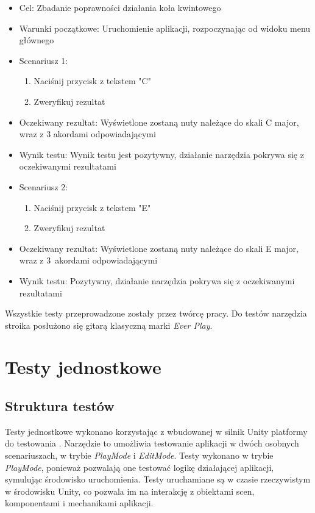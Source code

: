 \begin{itemize}
    \item Cel: Zbadanie poprawności działania koła kwintowego
    \item Warunki początkowe: Uruchomienie aplikacji, rozpoczynając od widoku menu głównego
    \item Scenariusz 1:
        \begin{enumerate}
            \item Naciśnij przycisk z tekstem "C"
            \item Zweryfikuj rezultat
        \end{enumerate}
    \item Oczekiwany rezultat: Wyświetlone zostaną nuty należące do skali C major, wraz z 3 akordami odpowiadającymi 
    \item Wynik testu: Wynik testu jest pozytywny, działanie narzędzia pokrywa się z oczekiwanymi rezultatami
    \item Scenariusz 2:
        \begin{enumerate}
            \item Naciśnij przycisk z tekstem "E"
            \item Zweryfikuj rezultat
        \end{enumerate}
    \item Oczekiwany rezultat: Wyświetlone zostaną nuty należące do skali E major, wraz z 3~akordami odpowiadającymi 
    \item Wynik testu: Pozytywny, działanie narzędzia pokrywa się z oczekiwanymi rezultatami
\end{itemize}

Wszystkie testy przeprowadzone zostały przez twórcę pracy. Do testów narzędzia stroika posłużono się gitarą klasyczną marki \emph{Ever Play}.

\section{Testy jednostkowe}

\subsection{Struktura testów}

Testy jednostkowe wykonano korzystając z wbudowanej w silnik Unity platformy do testowania \cite{UnityTestFramework}. Narzędzie to umożliwia testowanie aplikacji w dwóch osobnych scenariuszach, w trybie \emph{PlayMode} i \emph{EditMode}. Testy wykonano w trybie \emph{PlayMode}, ponieważ pozwalają one testować logikę działającej aplikacji, symulując środowisko uruchomienia. Testy uruchamiane są w czasie rzeczywistym w środowisku Unity, co pozwala im na interakcję z obiektami scen, komponentami i mechanikami aplikacji.

